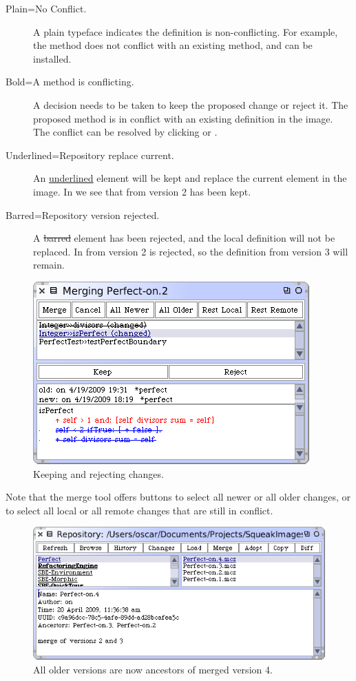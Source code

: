 \documentclass[a4paper,10pt,twoside]{book}
\begin{document}
\begin{description}
\item[Plain=No Conflict.] A plain typeface indicates the definition is non-conflicting. For example, the method  does not conflict with an existing method, and can be installed.
\item[Bold=A method is conflicting.] A decision needs to be taken to keep the proposed change or reject it. The proposed method  is in conflict with an existing definition in the image. The conflict can be resolved by clicking  or .
\item[Underlined=Repository replace current.] An \underline{underlined} element will be kept and replace the current element in the image. In  we see that  from version 2 has been kept.
\item[Barred=Repository version rejected.] A \sout{barred} element has been rejected, and the local definition will not be replaced. In   from version 2 is rejected, so the definition from version 3 will remain.
\end{description}

\begin{figure}[ht]\centering
	\includegraphics[width=.55\textwidth]{keepReject}
	\caption{Keeping and rejecting changes.
	}
\end{figure}

Note that the merge tool offers buttons to select all newer or all older changes, or to select all local or all remote changes that are still in conflict.


\begin{figure}[ht]\centering
	\includegraphics[width=.8\textwidth]{merged}
	\caption{All older versions are now ancestors of merged version 4.
	}
\end{figure}
\end{document}
